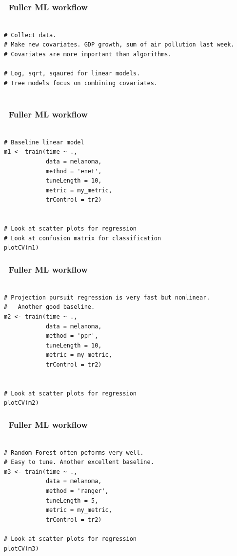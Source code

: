 \documentclass[handout, aspectratio = 169]{beamer}
\begin{document}
	

\begin{frame}[fragile]
\frametitle{\insertframenumber~Fuller ML workflow}
\begin{Verbatim}

# Collect data.
# Make new covariates. GDP growth, sum of air pollution last week.
# Covariates are more important than algorithms.

# Log, sqrt, sqaured for linear models.
# Tree models focus on combining covariates.


\end{Verbatim}

\end{frame} 



\begin{frame}[fragile]
\frametitle{\insertframenumber~Fuller ML workflow}
\begin{Verbatim}

# Baseline linear model
m1 <- train(time ~ ., 
            data = melanoma,
            method = 'enet',
            tuneLength = 10,
            metric = my_metric,
            trControl = tr2)


# Look at scatter plots for regression
# Look at confusion matrix for classification
plotCV(m1)

\end{Verbatim}

\end{frame} 



\begin{frame}[fragile]
\frametitle{\insertframenumber~Fuller ML workflow}
\begin{Verbatim}

# Projection pursuit regression is very fast but nonlinear.
#   Another good baseline.
m2 <- train(time ~ ., 
            data = melanoma,
            method = 'ppr',
            tuneLength = 10,
            metric = my_metric,
            trControl = tr2)


# Look at scatter plots for regression
plotCV(m2)

\end{Verbatim}

\end{frame} 


\begin{frame}[fragile]
\frametitle{\insertframenumber~Fuller ML workflow}
\begin{Verbatim}

# Random Forest often peforms very well.
# Easy to tune. Another excellent baseline.
m3 <- train(time ~ ., 
            data = melanoma,
            method = 'ranger',
            tuneLength = 5,
            metric = my_metric,
            trControl = tr2)

# Look at scatter plots for regression
plotCV(m3)
\end{Verbatim}

\end{frame} 
\end{document}

